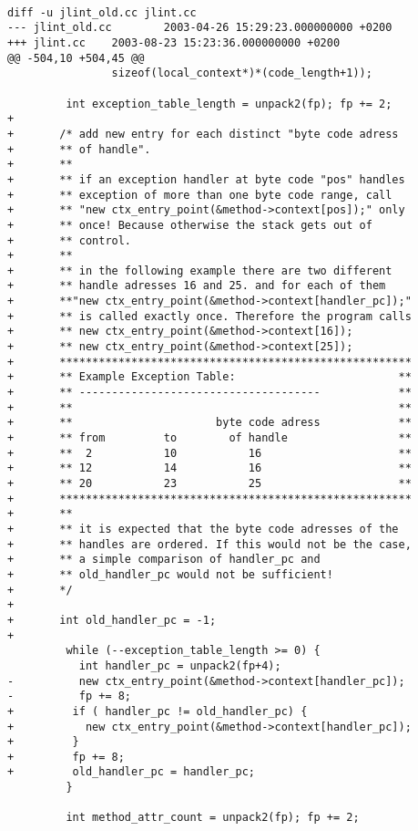 \documentclass[11pt,twoside,a4paper,draft]{article}
\begin{document}
\begin{verbatim}

diff -u jlint_old.cc jlint.cc
--- jlint_old.cc        2003-04-26 15:29:23.000000000 +0200
+++ jlint.cc    2003-08-23 15:23:36.000000000 +0200
@@ -504,10 +504,45 @@
                sizeof(local_context*)*(code_length+1));
 
         int exception_table_length = unpack2(fp); fp += 2;
+
+       /* add new entry for each distinct "byte code adress 
+       ** of handle".
+       **
+       ** if an exception handler at byte code "pos" handles
+       ** exception of more than one byte code range, call
+       ** "new ctx_entry_point(&method->context[pos]);" only
+       ** once! Because otherwise the stack gets out of 
+       ** control. 
+       **
+       ** in the following example there are two different
+       ** handle adresses 16 and 25. and for each of them 
+       **"new ctx_entry_point(&method->context[handler_pc]);"
+       ** is called exactly once. Therefore the program calls
+       ** new ctx_entry_point(&method->context[16]);
+       ** new ctx_entry_point(&method->context[25]);
+       ******************************************************
+       ** Example Exception Table:                         **
+       ** -------------------------------------            **
+       **                                                  **
+       **                      byte code adress            **
+       ** from         to        of handle                 **
+       **  2           10           16                     **
+       ** 12           14           16                     **
+       ** 20           23           25                     **
+       ******************************************************
+       **
+       ** it is expected that the byte code adresses of the
+       ** handles are ordered. If this would not be the case,
+       ** a simple comparison of handler_pc and 
+       ** old_handler_pc would not be sufficient!
+       */
+
+       int old_handler_pc = -1;
+
         while (--exception_table_length >= 0) { 
           int handler_pc = unpack2(fp+4);
-          new ctx_entry_point(&method->context[handler_pc]); 
-          fp += 8;
+         if ( handler_pc != old_handler_pc) {
+           new ctx_entry_point(&method->context[handler_pc]); 
+         }
+         fp += 8;
+         old_handler_pc = handler_pc;
         }
 
         int method_attr_count = unpack2(fp); fp += 2;

\end{verbatim}
\end{document}
